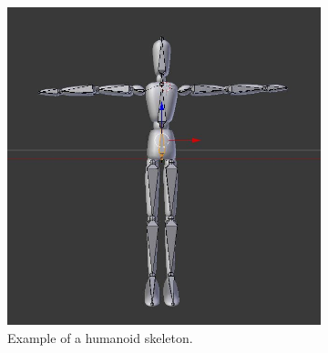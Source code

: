 \begin{figure}[h!]
	\centering
        \begin{subfigure}[b!]{0.55\textwidth}
        	\centering
                \includegraphics[width=\linewidth]{img/skeleton}
                \caption{Example of a humanoid skeleton.}
                \label{fig:skeleton}
        \end{subfigure}
        \quad
        \begin{subfigure}[b!]{0.4\textwidth}
        	\centering

\end{subfigure}
\end{figure}
